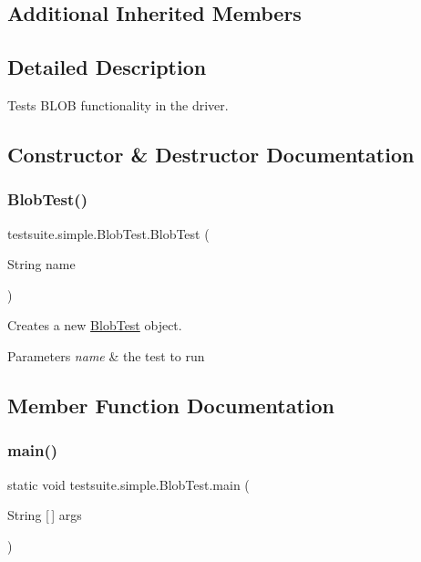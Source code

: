 \subsection*{Additional Inherited Members}


\subsection{Detailed Description}
Tests B\+L\+OB functionality in the driver. 

\subsection{Constructor \& Destructor Documentation}
\mbox{\label{classtestsuite_1_1simple_1_1_blob_test_a2741df6da9d07c3c6b8ba36abf15bc86}} 
\subsubsection{\texorpdfstring{Blob\+Test()}{BlobTest()}}
{\footnotesize\ttfamily testsuite.\+simple.\+Blob\+Test.\+Blob\+Test (\begin{DoxyParamCaption}\item[{String}]{name }\end{DoxyParamCaption})}

Creates a new \mbox{\hyperlink{classtestsuite_1_1simple_1_1_blob_test}{Blob\+Test}} object.


\begin{DoxyParams}{Parameters}
{\em name} & the test to run \\
\hline
\end{DoxyParams}


\subsection{Member Function Documentation}
\mbox{\label{classtestsuite_1_1simple_1_1_blob_test_afda9a3e28dbbf808702dcf118e046ec6}} 
\subsubsection{\texorpdfstring{main()}{main()}}
{\footnotesize\ttfamily static void testsuite.\+simple.\+Blob\+Test.\+main (\begin{DoxyParamCaption}\item[{String \mbox{[}$\,$\mbox{]}}]{args }\end{DoxyParamCaption})\hspace{0.3cm}{\ttfamily [static]}}

